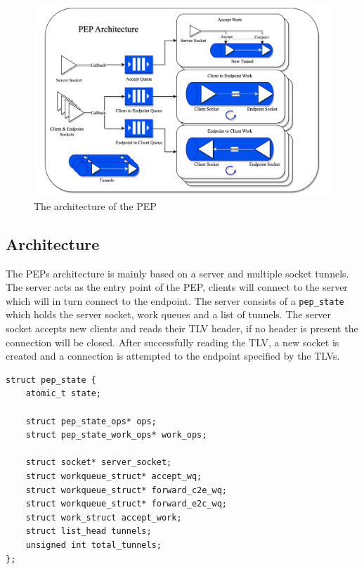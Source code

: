 \documentclass[a4paper,english, 11pt]{report}
\begin{document}
\begin{figure} %
	\centering
	\includegraphics[scale=0.35]{../diagrams/drawio/pep_architecture.png}
  	\caption{The architecture of the PEP}
  	\label{fig:pep_architecture}
\end{figure}

\subsection{Architecture}
The PEPs architecture is mainly based on a server and multiple socket tunnels. The server acts as the entry point of the PEP, clients will connect to the server which will in turn connect to the endpoint. The server consists of a \verb|pep_state| which holds the server socket, work queues and a list of tunnels. The server socket accepts new clients and reads their TLV header, if no header is present the connection will be closed. After successfully reading the TLV, a new socket is created and a connection is attempted to the endpoint specified by the TLVs.\\

\noindent\begin{minipage}{\linewidth}
\begin{verbatim}
struct pep_state {
    atomic_t state;
    
    struct pep_state_ops* ops;
    struct pep_state_work_ops* work_ops;
    
    struct socket* server_socket;
    struct workqueue_struct* accept_wq;
    struct workqueue_struct* forward_c2e_wq;
    struct workqueue_struct* forward_e2c_wq;
    struct work_struct accept_work;
    struct list_head tunnels;
    unsigned int total_tunnels;
};
\end{verbatim}
\label{fig:pep_state_structure}
\end{minipage}
\end{document}
